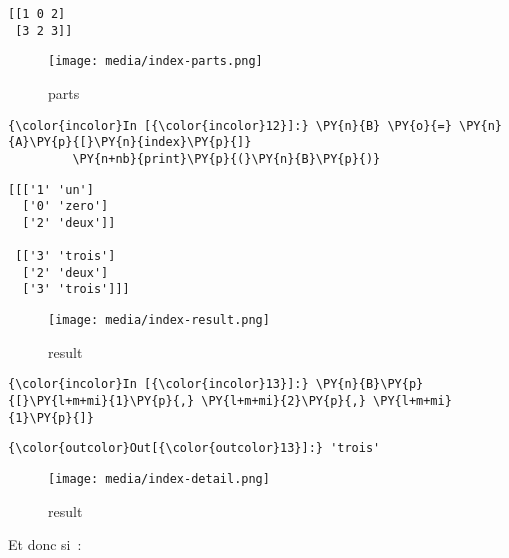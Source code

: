     \begin{Verbatim}[commandchars=\\\{\},frame=single,framerule=0.3mm,rulecolor=\color{cellframecolor}]
[[1 0 2]
 [3 2 3]]
\end{Verbatim}

    \begin{figure}
\centering
\texttt{[image: media/index-parts.png]}
\caption{parts}
\end{figure}

    \begin{Verbatim}[commandchars=\\\{\},frame=single,framerule=0.3mm,rulecolor=\color{cellframecolor}]
{\color{incolor}In [{\color{incolor}12}]:} \PY{n}{B} \PY{o}{=} \PY{n}{A}\PY{p}{[}\PY{n}{index}\PY{p}{]}
         \PY{n+nb}{print}\PY{p}{(}\PY{n}{B}\PY{p}{)}
\end{Verbatim}


    \begin{Verbatim}[commandchars=\\\{\},frame=single,framerule=0.3mm,rulecolor=\color{cellframecolor}]
[[['1' 'un']
  ['0' 'zero']
  ['2' 'deux']]

 [['3' 'trois']
  ['2' 'deux']
  ['3' 'trois']]]
\end{Verbatim}

    \begin{figure}
\centering
\texttt{[image: media/index-result.png]}
\caption{result}
\end{figure}

    \begin{Verbatim}[commandchars=\\\{\},frame=single,framerule=0.3mm,rulecolor=\color{cellframecolor}]
{\color{incolor}In [{\color{incolor}13}]:} \PY{n}{B}\PY{p}{[}\PY{l+m+mi}{1}\PY{p}{,} \PY{l+m+mi}{2}\PY{p}{,} \PY{l+m+mi}{1}\PY{p}{]}
\end{Verbatim}


\begin{Verbatim}[commandchars=\\\{\},frame=single,framerule=0.3mm,rulecolor=\color{cellframecolor}]
{\color{outcolor}Out[{\color{outcolor}13}]:} 'trois'
\end{Verbatim}
            
    \begin{figure}
\centering
\texttt{[image: media/index-detail.png]}
\caption{result}
\end{figure}

    Et donc si~:

